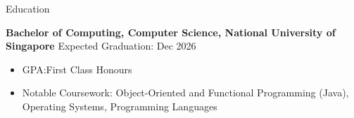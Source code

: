 \documentclass{phanuphat_srisukhawasu_resume} %
\begin{document}

%
%


\begin{rSection}{Education}

  \textbf{Bachelor of Computing, Computer Science, National University of Singapore} \hfill {Expected Graduation: Dec 2026}
  \begin{itemize}
    \item GPA:\@ First Class Honours
    \item Notable Coursework: Object-Oriented and Functional Programming (Java), Operating Systems, Programming Languages
  \end{itemize}

\end{rSection}

\end{document}
